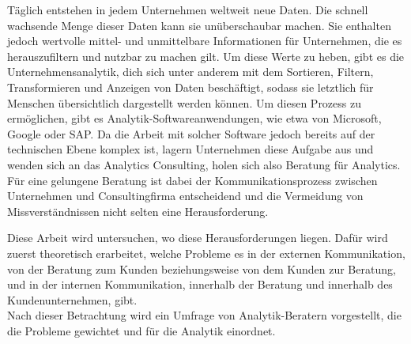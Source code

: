 \documentclass[../main.tex]{subfiles}
\begin{document}
Täglich entstehen in jedem Unternehmen weltweit neue Daten.
Die schnell wachsende Menge dieser Daten kann sie unüberschaubar machen. Sie enthalten jedoch wertvolle mittel- und unmittelbare Informationen für Unternehmen, die es herauszufiltern und nutzbar zu machen gilt.
Um diese Werte zu heben, gibt es die Unternehmensanalytik, dich sich unter anderem mit dem Sortieren, Filtern, Transformieren und Anzeigen von Daten beschäftigt, sodass sie letztlich für Menschen übersichtlich dargestellt werden können.
Um diesen Prozess zu ermöglichen, gibt es Analytik-Softwareanwendungen, wie etwa von Microsoft, Google oder SAP.\@
Da die Arbeit mit solcher Software jedoch bereits auf der technischen Ebene komplex ist, lagern Unternehmen diese Aufgabe aus und wenden sich an das Analytics Consulting, holen sich also Beratung für Analytics.
Für eine gelungene Beratung ist dabei der Kommunikationsprozess zwischen Unternehmen und Consultingfirma entscheidend und die Vermeidung von Missverständnissen nicht selten eine Herausforderung.
 
Diese Arbeit wird untersuchen, wo diese Herausforderungen liegen.
Dafür wird zuerst theoretisch erarbeitet, welche Probleme es in der externen Kommunikation, von der Beratung zum Kunden beziehungsweise von dem Kunden zur Beratung, und in der internen Kommunikation, innerhalb der Beratung und innerhalb des Kundenunternehmen, gibt. 
\\
Nach dieser Betrachtung wird ein Umfrage von Analytik-Beratern vorgestellt, die die Probleme gewichtet und für die Analytik einordnet.
\end{document}
